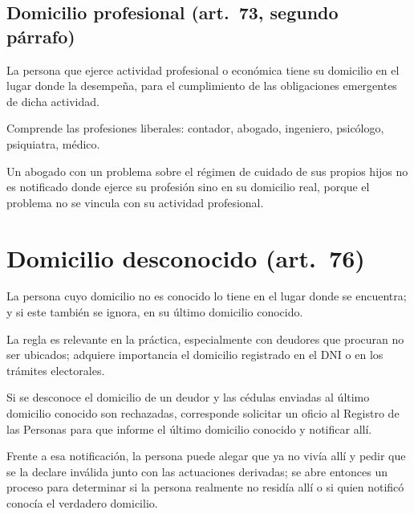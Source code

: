 \documentclass[12pt,oneside]{book}
\begin{document}
\subsection{Domicilio profesional (art.~73, segundo párrafo)}

\begin{definicion}
La persona que ejerce actividad profesional o económica tiene su domicilio en el lugar donde la desempeña, para el cumplimiento de las obligaciones emergentes de dicha actividad.
\end{definicion}

Comprende las profesiones liberales: contador, abogado, ingeniero, psicólogo, psiquiatra, médico.

\begin{ejemplo}
Un abogado con un problema sobre el régimen de cuidado de sus propios hijos no es notificado donde ejerce su profesión sino en su domicilio real, porque el problema no se vincula con su actividad profesional.
\end{ejemplo}

\section{Domicilio desconocido (art.~76)}

\begin{regla}
La persona cuyo domicilio no es conocido lo tiene en el lugar donde se encuentra; y si este también se ignora, en su último domicilio conocido.
\end{regla}

La regla es relevante en la práctica, especialmente con deudores que procuran no ser ubicados; adquiere importancia el domicilio registrado en el DNI o en los trámites electorales.

\begin{ejemplo}
Si se desconoce el domicilio de un deudor y las cédulas enviadas al último domicilio conocido son rechazadas, corresponde solicitar un oficio al Registro de las Personas para que informe el último domicilio conocido y notificar allí.
\end{ejemplo}

Frente a esa notificación, la persona puede alegar que ya no vivía allí y pedir que se la declare inválida junto con las actuaciones derivadas; se abre entonces un proceso para determinar si la persona realmente no residía allí o si quien notificó conocía el verdadero domicilio.
\end{document}
